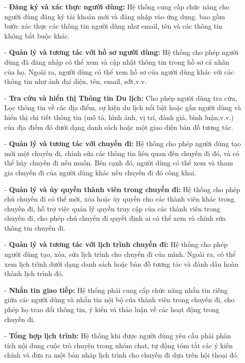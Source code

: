 \begin{itemize}
    \item[-] \textbf{Đăng ký và xác thực người dùng:} Hệ thống cung cấp chức năng cho người dùng đăng ký tài khoản mới và đăng nhập vào ứng dụng. bao gồm bước xác thực các thông tin người dùng như email, tên và các thông tin không bắt buộc khác.
    \item[-] \textbf{Quản lý và tương tác với hồ sơ người dùng:} Hệ thống cho phép người dùng đã đăng nhập có thể xem và cập nhật thông tin trong hồ sơ cá nhân của họ. Ngoài ra, người dùng có thể xem hồ sơ của người dùng khác với các thông tin như ảnh đại diện, tên, email, sđt,v.v.
    \item[-] \textbf{Tra cứu và hiển thị Thông tin Du lịch:} Cho phép người dùng tra cứu, Lọc thông tin về các địa điểm, sự kiện du lịch nổi bật hoặc gần người dùng và hiển thị chi tiết thông tin (mô tả, hình ảnh, vị trí, đánh giá, bình luận,v.v.) của địa điểm đó dưới dạng danh sách hoặc một giao diện bản đồ tương tác.
    \item[-] \textbf{Quản lý và tương tác với chuyến đi:} Hệ thống cho phép người dùng tạo mới một chuyến đi, chỉnh sửa các thông tin liên quan đến chuyến đi đó, và có thể hủy chuyến đi nếu muốn. Bên cạnh đó, người dùng có thể xem và tham gia chuyến đi của người dùng khác nếu chuyến đi đó công khai.
    \item[-] \textbf{Quản lý và ủy quyền thành viên trong chuyến đi:} Hệ thống cho phép chủ chuyến đi có thể mời, xóa hoặc ủy quyền cho các thành viên khác trong chuyến đi, hỗ trợ việc quản lý quyền truy cập của các thành viên trong chuyến đi, cho phép chủ chuyến đi quyết định ai có thể xem và chỉnh sửa thông tin chuyến đi.
    \item[-] \textbf{Quản lý và tương tác với lịch trình chuyến đi:} Hệ thống cho phép người dùng tạo, xóa, sửa lịch trình cho chuyến đi của mình. Ngoài ra, có thể xem lịch trình dưới dạng danh sách hoặc bản đồ tương tác và đánh dấu hoàn thành lịch trình đó.
    \item[-] \textbf{Nhắn tin giao tiếp:} Hệ thống phải cung cấp chức năng nhắn tin riêng giữa các người dùng và nhắn tin nội bộ của thành viên trong chuyến đi, cho phép họ trao đổi thông tin, ý kiến và thảo luận về các hoạt động trong chuyến đi.
    \item[-] \textbf{Tổng hợp lịch trình:} Hệ thống khi được người dùng yêu cầu phải phân tích nội dung cuộc trò chuyện trong nhóm chat, tự động tóm tắt các ý kiến chính và đưa ra một bản nháp lịch trình cho chuyến đi dựa trên hội thoại đó.

\end{itemize}
